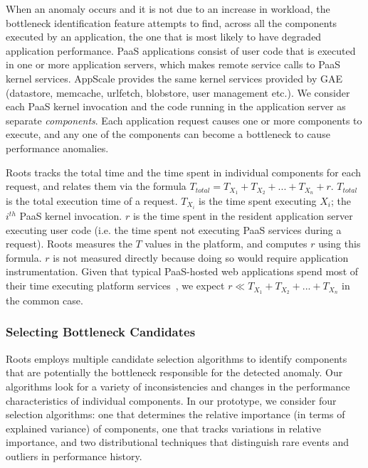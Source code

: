 When an anomaly occurs and it is not due to an increase in workload,
the bottleneck identification feature attempts to find, across all
the components executed by an application, the one that is most likely to have 
degraded application performance.
PaaS applications 
consist of user code that is executed in one or more application servers,
which makes remote service calls to PaaS kernel services. 
AppScale provides the same kernel services provided by GAE (datastore, memcache,
urlfetch, blobstore, user management etc.).
We consider each PaaS kernel invocation and the code running in the application server as 
separate \textit{components}. Each application request causes one or more components to
execute, and any one of the components can become a bottleneck to cause performance anomalies.  

Roots tracks the total time and the time spent in individual components for each request, 
and relates them via the formula $T_{total} = T_{X_1} + T_{X_2} + ... + T_{X_n} + r$. 
$T_{total}$ is the total execution time of a request. $T_{X_i}$ is the time spent executing
$X_i$; the $i^{th}$ PaaS kernel invocation.  $r$ is the time spent in the resident
application server executing user code (i.e. the time
spent not executing PaaS services during a request). Roots measures the $T$ values in the platform, and
computes $r$ using this formula. $r$ is not measured directly because doing so would require 
application instrumentation. Given that typical PaaS-hosted web
applications spend most of their time executing platform 
services~\cite{Jayathilaka:2015:RTS:2806777.2806842},
we expect $r \ll T_{X_1} + T_{X_2} + ... + T_{X_n}$ in the common case.

\subsubsection{Selecting Bottleneck Candidates}

Roots employs multiple candidate selection algorithms to identify 
components that are potentially
the bottleneck responsible for the detected anomaly. Our algorithms look for
a variety of inconsistencies and changes in the performance characteristics of 
individual components.  In our prototype, we consider four selection
algorithms:
one that determines the relative importance (in terms of explained variance)
of components, one that tracks 
variations in relative importance, and two 
distributional techniques that distinguish rare events and 
outliers in performance history.

